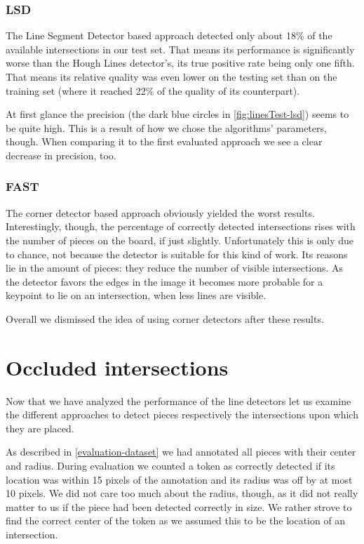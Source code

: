 	\subsubsection{LSD}
	\label{evaluation-visible-performance-lsd}
	The Line Segment Detector based approach detected only about 18\% of the available intersections in our test set. That means its performance is significantly worse than the Hough Lines detector's, its true positive rate being only one fifth. That means its relative quality was even lower on the testing set than on the training set (where it reached 22\% of the quality of its counterpart).

	At first glance the precision (the dark blue circles in \autoref{fig:linesTest-lsd}) seems to be quite high. This is a result of how we chose the algorithms' parameters, though. When comparing it to the first evaluated approach we see a clear decrease in precision, too.

	\subsubsection{FAST}
	\label{evaluation-visible-performance-fast}
	The corner detector based approach obviously yielded the worst results. Interestingly, though, the percentage of correctly detected intersections rises with the number of pieces on the board, if just slightly. Unfortunately this is only due to chance, not because the detector is suitable for this kind of work. Its reasons lie in the amount of pieces: they reduce the number of visible intersections. As the detector favors the edges in the image it becomes more probable for a keypoint to lie on an intersection, when less lines are visible.

	Overall we dismissed the idea of using corner detectors after these results.
	





	\section{Occluded intersections}
	\label{evaluation-occluded}
	Now that we have analyzed the performance of the line detectors let us examine the different approaches to detect pieces respectively the intersections upon which they are placed.

	As described in \autoref{evaluation-dataset} we had annotated all pieces with their center and radius. During evaluation we counted a token as correctly detected if its location was within 15 pixels of the annotation and its radius was off by at most 10 pixels. We did not care too much about the radius, though, as it did not really matter to us if the piece had been detected correctly in size. We rather strove to find the correct center of the token as we assumed this to be the location of an intersection.

